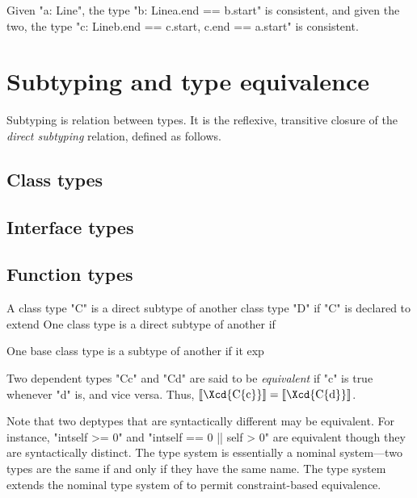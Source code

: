 Given \xcd"a: Line", the type \xcd"b: Line{a.end == b.start}" is consistent,
and
given the two, the type \xcd"c: Line{b.end == c.start, c.end == a.start}"
is consistent.


\section{Subtyping and type equivalence}\label{DepType:Equivalence}\label{deptype,equivalence}

Subtyping is relation between types.  It is the
reflexive, transitive 
closure of the {\em direct subtyping} relation, defined as
follows.

\subsection{Class types}

\subsection{Interface types}

\subsection{Function types}



A class type \xcd"C" is a direct subtype of another class type \xcd"D" if
\xcd"C" is declared to extend
One class type is a direct subtype of another if 

One base class type is a subtype of another if it exp

Two dependent types \xcd"C{c}" and \xcd"C{d}" are said to be {\em equivalent} if 
\xcd"c" is true whenever \xcd"d" is, and vice versa. Thus, 
$\LL{\mbox{\Xcd{C\{c\}}}} = \LL{\mbox{\Xcd{C\{d\}}}}$.

Note that two deptypes that are syntactically different may be
equivalent. For instance, \xcd"int{self >= 0}" and
\xcd"int{self == 0 || self > 0}" are equivalent though they are syntactically
distinct. The \Java{} type system is essentially a nominal system---two
types are the same if and only if they have the same name. The \Xten{}
type system extends the nominal type system of \Java{} to permit
constraint-based equivalence.

